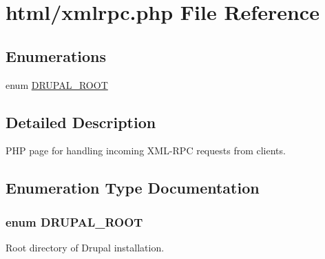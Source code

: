 \hypertarget{xmlrpc_8php}{
\section{html/xmlrpc.php File Reference}
\label{xmlrpc_8php}
}
\subsection*{Enumerations}
\begin{DoxyCompactItemize}
\item 
enum \hyperlink{xmlrpc_8php_a21cf187d162beffb1fbc5a1d1098f4f9}{DRUPAL\_\-ROOT} 
\end{DoxyCompactItemize}


\subsection{Detailed Description}
PHP page for handling incoming XML-\/RPC requests from clients. 

\subsection{Enumeration Type Documentation}
\hypertarget{xmlrpc_8php_a21cf187d162beffb1fbc5a1d1098f4f9}{
\subsubsection[{DRUPAL\_\-ROOT}]{\setlength{\rightskip}{0pt plus 5cm}enum {\bf DRUPAL\_\-ROOT}}}
\label{xmlrpc_8php_a21cf187d162beffb1fbc5a1d1098f4f9}
Root directory of Drupal installation. 